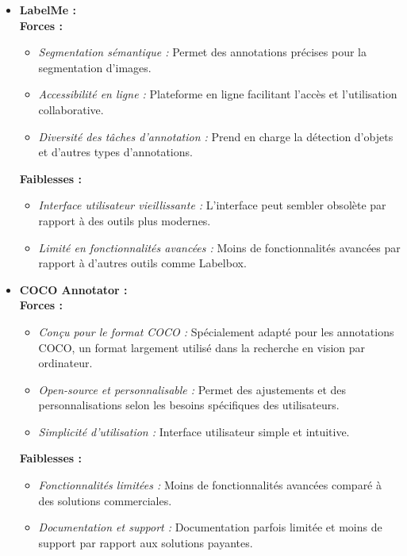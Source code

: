 \begin{itemize}
	\item \textbf{LabelMe :}\\
		\textbf{Forces :}
		\begin{itemize}
			\item \textit{Segmentation sémantique :} Permet des annotations précises pour la segmentation d'images.
			\item \textit{Accessibilité en ligne :} Plateforme en ligne facilitant l'accès et l'utilisation collaborative.
			\item \textit{Diversité des tâches d'annotation :} Prend en charge la détection d'objets et d'autres types d'annotations.
		\end{itemize}
		\textbf{Faiblesses :}
		\begin{itemize}
			\item \textit{Interface utilisateur vieillissante :} L'interface peut sembler obsolète par rapport à des outils plus modernes.
			\item \textit{Limité en fonctionnalités avancées :} Moins de fonctionnalités avancées par rapport à d'autres outils comme Labelbox.
		\end{itemize}
	
	\item \textbf{COCO Annotator :} \\
		\textbf{Forces :}
		\begin{itemize}
			\item \textit{Conçu pour le format COCO :} Spécialement adapté pour les annotations COCO, un format largement utilisé dans la recherche en vision par ordinateur.
			\item \textit{Open-source et personnalisable :} Permet des ajustements et des personnalisations selon les besoins spécifiques des utilisateurs.
			\item \textit{Simplicité d'utilisation :} Interface utilisateur simple et intuitive.
		\end{itemize}
		\textbf{Faiblesses :}
		\begin{itemize}
			\item \textit{Fonctionnalités limitées :} Moins de fonctionnalités avancées comparé à des solutions commerciales.
			\item \textit{Documentation et support :} Documentation parfois limitée et moins de support par rapport aux solutions payantes.
		\end{itemize}
	

\end{itemize}

